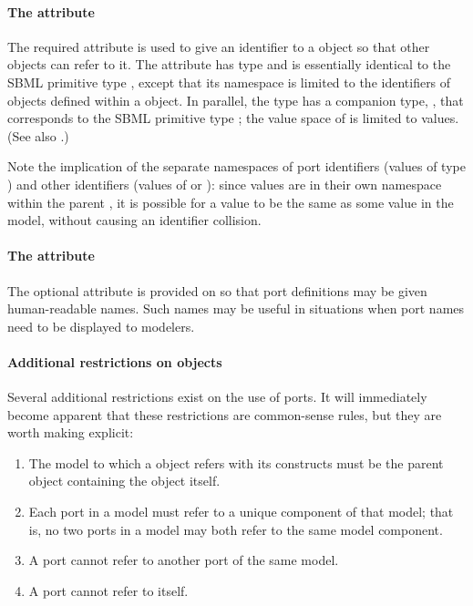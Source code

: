 \paragraph{The \fixttspace{} attribute}

The required attribute  is used to give an identifier to a
\Port object so that other objects can refer to it.  The attribute has
type  and is essentially identical to the SBML
primitive type , except that its namespace is limited to
the identifiers of \Port objects defined within a \Model object.  In
parallel, the  type has a companion type,
, that corresponds to the SBML primitive type
; the value space of  is limited
to  values.  (See also .)

Note the implication of the separate namespaces of port identifiers
(values of type ) and other identifiers (values of
 or ): since  values
are in their own namespace within the parent \Model, it is possible for
a  value to be the same as some  value
in the model, without causing an identifier collision.


\paragraph{The \fixttspace{} attribute}

The optional  attribute is provided on \Port so that port
definitions may be given human-readable names.  Such names may be useful
in situations when port names need to be displayed to modelers.


\paragraph{Additional restrictions on  objects}

Several additional restrictions exist on the use of ports.  It will
immediately become apparent that these restrictions are common-sense
rules, but they are worth making explicit:

\begin{enumerate}

  \item The model to which a \Port object refers with its \SBaseRef constructs
    must be the parent \Model object containing the \Port object itself.

  \item Each port in a model must refer to a unique component of that
    model; that is, no two ports in a model may both refer to the same
    model component.

  \item A port cannot refer to another port of the same model.

  \item A port cannot refer to itself.
    
\end{enumerate}
  
